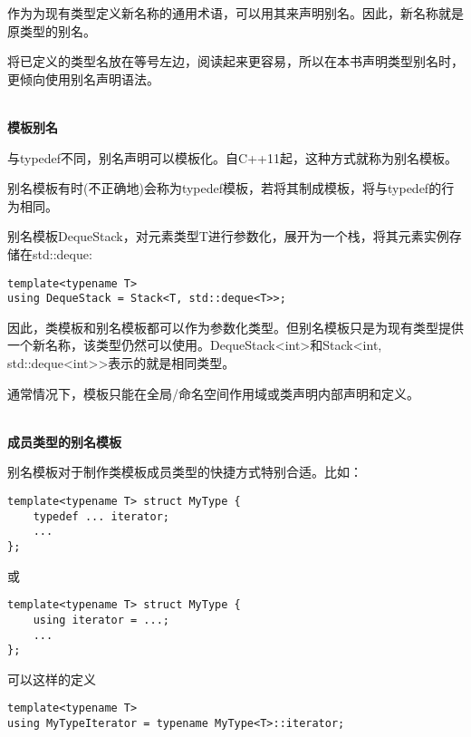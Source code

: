 作为为现有类型定义新名称的通用术语，可以用其来声明别名。因此，新名称就是原类型的别名。

将已定义的类型名放在等号左边，阅读起来更容易，所以在本书声明类型别名时，更倾向使用别名声明语法。

\hspace*{\fill} \\ %
\noindent
\textbf{模板别名}

与typedef不同，别名声明可以模板化。自C++11起，这种方式就称为别名模板。

\begin{tcolorbox}[colback=webgreen!5!white,colframe=webgreen!75!black]
\hspace*{0.75cm}别名模板有时(不正确地)会称为typedef模板，若将其制成模板，将与typedef的行为相同。
\end{tcolorbox}

别名模板DequeStack，对元素类型T进行参数化，展开为一个栈，将其元素实例存储在std::deque:

\begin{lstlisting}[style=styleCXX]
template<typename T>
using DequeStack = Stack<T, std::deque<T>>;
\end{lstlisting}

因此，类模板和别名模板都可以作为参数化类型。但别名模板只是为现有类型提供一个新名称，该类型仍然可以使用。DequeStack<int>和Stack<int, std::deque<int>>表示的就是相同类型。

通常情况下，模板只能在全局/命名空间作用域或类声明内部声明和定义。

\hspace*{\fill} \\ %
\noindent
\textbf{成员类型的别名模板}

别名模板对于制作类模板成员类型的快捷方式特别合适。比如：

\begin{lstlisting}[style=styleCXX]
template<typename T> struct MyType {
	typedef ... iterator;
	...
};
\end{lstlisting}

或

\begin{lstlisting}[style=styleCXX]
template<typename T> struct MyType {
	using iterator = ...;
	...
};
\end{lstlisting}

可以这样的定义

\begin{lstlisting}[style=styleCXX]
template<typename T>
using MyTypeIterator = typename MyType<T>::iterator;
\end{lstlisting}

